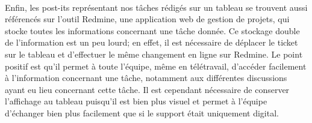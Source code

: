 \paragraph{}
Enfin, les post-its représentant nos tâches rédigés sur un tableau se trouvent aussi référencés sur l'outil Redmine, une application web de gestion de projets, qui stocke toutes les informations concernant une tâche donnée.
Ce stockage double de l'information est un peu lourd; en effet, il est nécessaire de déplacer le ticket sur le tableau et d'effectuer le même changement en ligne sur Redmine.
Le point positif est qu'il permet à toute l'équipe, même en télétravail, d'accéder facilement à l'information concernant une tâche, notamment aux différentes discussions ayant eu lieu concernant cette tâche.
Il est cependant nécessaire de conserver l'affichage au tableau puisqu'il est bien plus visuel et permet à l'équipe d'échanger bien plus facilement que si le support était uniquement digital.
